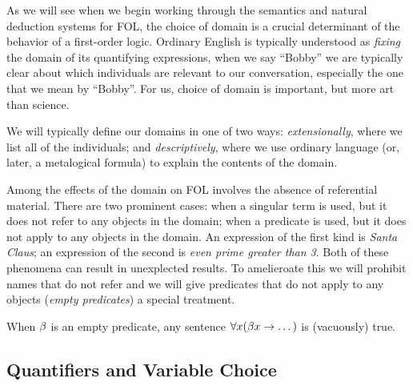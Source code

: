 As we will see when we begin working through the semantics and natural deduction
systems for FOL, the choice of domain is a crucial determinant of the behavior
of a first-order logic. Ordinary English is typically understood as
\emph{fixing} the domain of its quantifying expressions, when we say ``Bobby''
we are typically clear about which individuals are relevant to our conversation,
especially the one that we mean by ``Bobby''. For us, choice of domain is
important, but more art than science.

We will typically define our domains in one of two ways: \emph{extensionally},
where we list all of the individuals; and \emph{descriptively}, where we use
ordinary language (or, later, a metalogical formula) to explain the contents of
the domain.


Among the effects of the domain on FOL involves the absence of referential
material. There are two prominent cases: when a singular term is used, but
it does not refer to any objects in the domain; when a predicate is used, but
it does not apply to any objects in the domain. An expression of the first kind
is \emph{Santa Claus}; an expression of the second is \emph{even prime greater
than 3}. Both of these phenomena can result in unexplected results. To
amelieroate this we will prohibit names that do not refer and we will give
predicates that do not apply to any objects (\emph{empty predicates}) a special
treatment.

\begin{definition}
  When $\beta$ is an empty predicate, any sentence
  $\forall x(\beta x\rightarrow\dots)$ is (vacuously) true.
\end{definition}


\subsection{Quantifiers and Variable Choice}

